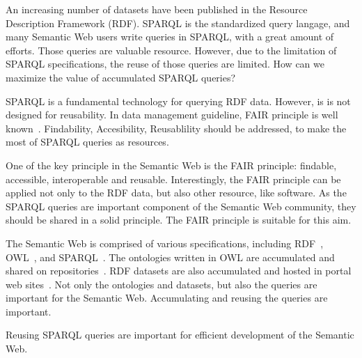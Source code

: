 \documentclass[runningheads]{llncs}
\begin{document}
An increasing number of datasets have been published in the Resource Description Framework (RDF).
SPARQL is the standardized query langage, and many Semantic Web users write queries in SPARQL, with a great amount of efforts.
Those queries are valuable resource.
However, due to the limitation of SPARQL specifications, the reuse of those queries are limited. How can we maximize the value of accumulated SPARQL queries?

SPARQL is a fundamental technology for querying RDF data. However, is is not designed for reusability. In data management guideline, FAIR principle is well known~\cite{fair}. Findability, Accesibility, Reusablility should be addressed, to make the most of SPARQL queries as resources. 

One of the key principle in the Semantic Web is the FAIR principle: findable, accessible, interoperable and reusable.
Interestingly, the FAIR principle can be applied not only to the RDF data, but also other resource, like software.
As the SPARQL queries are important component of the Semantic Web community,
they should be shared in a solid principle.
The FAIR principle is suitable for this aim.

The Semantic Web is comprised of various specifications, including RDF~\cite{rdf}, OWL~\cite{owl}, and SPARQL~\cite{sparql}. The ontologies written in OWL are accumulated and shared on repositories~\cite{bioportal}.
RDF datasets are also accumulated and hosted in portal web sites~\cite{rdf-portal}.
Not only the ontologies and datasets, but also the queries are important for the Semantic Web.
Accumulating and reusing the queries are important.

Reusing SPARQL queries are important for efficient development of the Semantic Web. 
\end{document}
